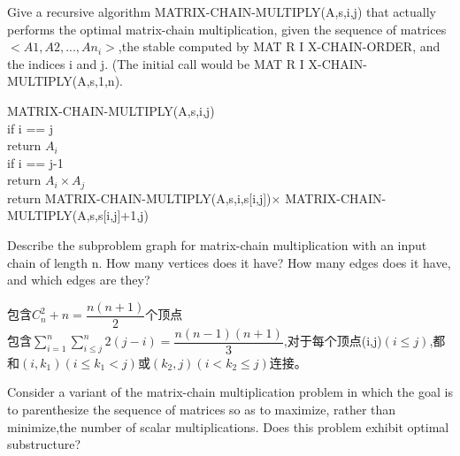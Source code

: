 \documentclass[a4paper, justified]{tufte-handout}
\begin{document}
\begin{problem}[TC 15.2-2]
Give  a  recursive  algorithm  MATRIX-CHAIN-MULTIPLY(A,s,i,j) that  actually performs the optimal matrix-chain multiplication, given the sequence of matrices $<A1,A2,...,An_i>$,the stable computed by MAT R I X-CHAIN-ORDER, and the indices i and j. (The initial call would be MAT R I X-CHAIN-MULTIPLY(A,s,1,n).

\end{problem}

\begin{solution}
MATRIX-CHAIN-MULTIPLY(A,s,i,j)\\
\hspace*{0.6 cm} if i == j\\
\hspace*{1.3 cm}     return $A_i$\\
\hspace*{0.6 cm} if i == j-1\\
\hspace*{1.3 cm}     return $A_i \times A_j$\\
\hspace*{0.6 cm} return MATRIX-CHAIN-MULTIPLY(A,s,i,s[i,j])$\times$ MATRIX-CHAIN-MULTIPLY(A,s,s[i,j]+1,j)

\end{solution}

\begin{problem}[TC 15.2-4]
Describe the subproblem graph for matrix-chain multiplication with an input chain of length n.  How many vertices does it have?  How many edges does it have, and which edges are they?
\end{problem}

\begin{solution}
包含$C_n^2+n=\dfrac{n(n+1)}{2}$个顶点\\
包含$\sum\limits_{i=1}^{n}\sum\limits_{i\leqslant j}^{n}2(j-i)=\dfrac{n(n-1)(n+1)}{3}$,对于每个顶点(i,j)$(i\leqslant j)$,都和$(i,k_1)(i\leqslant k_1 < j)$或$(k_2,j)(i < k_2 \leqslant j)$连接。
\end{solution}

\begin{problem}[TC 15.3-3]
Consider a variant of the matrix-chain multiplication problem in which the goal is to parenthesize the sequence of matrices so as to maximize, rather than minimize,the number of scalar multiplications.  Does this problem exhibit optimal substructure?
\end{problem}
\end{document}
